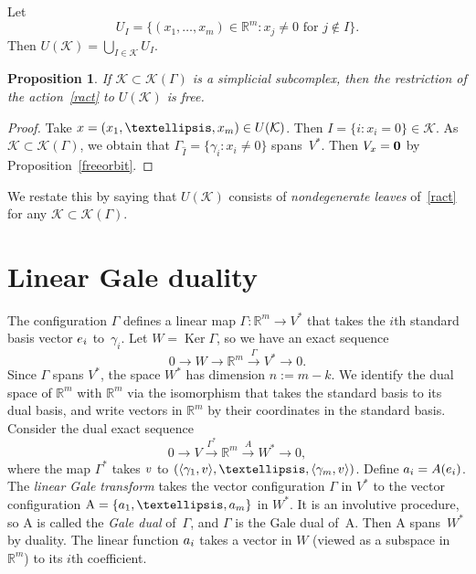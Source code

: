 \documentclass[a4paper]{amsart}
\newtheorem{proposition}[theorem]{Proposition}
\theoremstyle{definition}
\theoremstyle{remark}
\numberwithin{equation}{section}
\def\R{\mathbb R}
\def\R{\mathbb R}
\def\sK{\mathcal K}
\newcommand{\mb}[1]{{\textbf {\textit#1}}}
\def\Ker{\mathop{\mathrm{Ker}}}
\newcommand{\<}{\langle}
\renewcommand{\>}{\rangle}
\begin{document}
Let
\begin{equation}\label{affui}
  U_I=\{(x_1,\ldots,x_m)\in\R^m\colon x_j\ne0\text{ for }j\notin I\}.
\end{equation}
Then $U(\sK)=\bigcup_{I\in\sK} U_I$.

\begin{proposition}\label{free}
If $\sK\subset\sK(\Gamma)$ is a simplicial subcomplex, then the restriction of the action~\eqref{ract} to $U(\sK)$ is free.
\end{proposition}
\begin{proof}
Take $\mb x=(x_1,\ldots,x_m)\in U(\sK)$. Then $I=\{i\colon x_i=0\}\in\sK$. As $\sK\subset\sK(\Gamma)$, we obtain that $\Gamma_{\widehat I}=\{\gamma_i\colon x_i\ne0\}$ spans~$V^*$. Then $V_{\mb x}=\bf0$ by Proposition~\ref{freeorbit}.
\end{proof}

We restate this by saying that $U(\sK)$ consists of \emph{nondegenerate leaves} of~\eqref{ract} for any $\sK\subset\sK(\Gamma)$.



\section{Linear Gale duality}\label{galesec}
The configuration $\Gamma$ defines a linear map $\varGamma\colon\R^m\to V^*$ that takes the $i$th standard basis vector $\mb e_i$ to~$\gamma_i$. Let $W=\Ker\varGamma$, so we have an exact sequence
\begin{equation}\label{1exseq}
  0\longrightarrow W\longrightarrow\R^m
  \stackrel{\varGamma}\longrightarrow V^*\longrightarrow0.
\end{equation}
Since $\Gamma$ spans $V^*$, the space $W^*$ has dimension $n:=m-k$. We identify the dual space of $\R^m$ with $\R^m$ via the
isomorphism that takes the standard basis to its dual basis, and write vectors in $\R^m$ by their coordinates in the standard basis. Consider the dual exact sequence
\[
  0\longrightarrow V\stackrel{\varGamma^*}{\longrightarrow}\R^m
  \stackrel{A}\longrightarrow W^*\longrightarrow0,
\]
where the map $\varGamma^*$ takes $\mb v$ to $(\langle\gamma_1,\mb v\rangle,\ldots,\langle\gamma_m,\mb v\rangle)$.
Define $\mb a_i=A(\mb e_i)$. The \emph{linear Gale transform} takes the vector configuration $\Gamma$ in $V^*$ to the vector configuration $\mathrm{A}=\{\mb a_1,\ldots,\mb a_m\}$ in $W^*$. It is an involutive procedure, so $\mathrm A$ is called the \emph{Gale dual}
of~$\Gamma$, and $\Gamma$ is the Gale dual of~$\mathrm{A}$. Then $\mathrm A$ spans~$W^*$ by duality. The linear function $\mb a_i$ takes a vector in $W$ (viewed as a subspace in~$\R^m$) to its $i$th coefficient.
\end{document}
